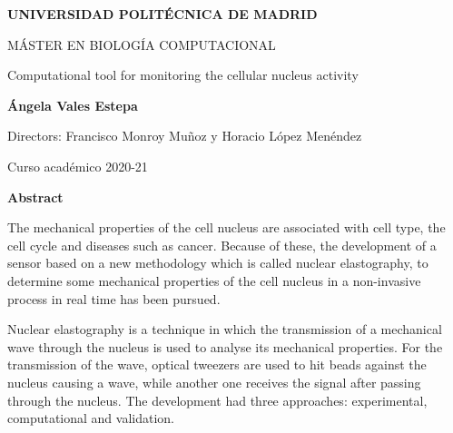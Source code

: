 \documentclass[12pt, a4paper]{article} %
\begin{document}
\setlength{\parindent}{8pt}

\pagestyle{empty}


\begin{titlepage}

{} %
\vspace{1cm}

\centering
{ \bfseries \Large UNIVERSIDAD POLITÉCNICA DE MADRID}
\vspace{2cm}

{ \Large MÁSTER EN BIOLOGÍA COMPUTACIONAL}
\vspace{2cm}

{\Large Computational tool for monitoring the cellular nucleus activity}\vspace{2cm}

{\bfseries \LARGE Ángela Vales Estepa}\vspace{2cm}

{\Large Directors: Francisco Monroy Muñoz y Horacio López Menéndez}\vspace{20mm} 

{\large Curso acad\'emico 2020-21}\vspace{5mm} 

\end{titlepage}
\newpage


{\bfseries \Large Abstract }\vspace{5mm} 

The mechanical properties of the cell nucleus are associated with cell type, the cell cycle and diseases such as cancer. Because of these, the development of a sensor based on a new methodology which is called nuclear elastography, to determine some mechanical properties of the cell nucleus in a non-invasive process in real time has been pursued.

Nuclear elastography is a technique in which the transmission of a mechanical wave through the nucleus is used to analyse its mechanical properties. For the transmission of the wave, optical tweezers are used to hit beads against the nucleus causing a wave, while another one receives the signal after passing through the nucleus. The development had three approaches: experimental, computational and validation. 
\end{document}
